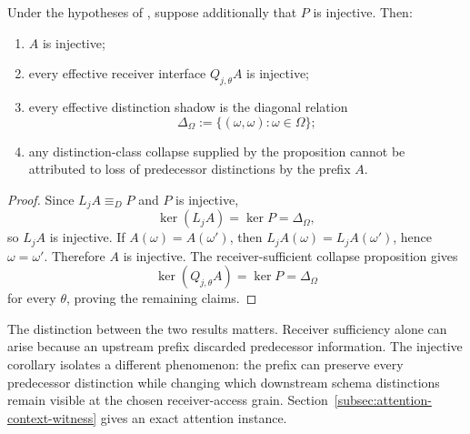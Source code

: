 \begin{corollary}\label{cor:injective-receiver-sufficient-v14}
Under the hypotheses of , suppose additionally that $P$ is injective. Then:
\begin{enumerate}[label=(\roman*)]
\item $A$ is injective;
\item every effective receiver interface $Q_{j,\theta}A$ is injective;
\item every effective distinction shadow is the diagonal relation
\[
\Delta_\Omega:=\{(\omega,\omega):\omega\in\Omega\};
\]
\item any distinction-class collapse supplied by the proposition cannot be attributed to loss of predecessor distinctions by the prefix $A$.
\end{enumerate}
\end{corollary}

\begin{proof}
Since $L_jA\equiv_DP$ and $P$ is injective,
\[
\ker(L_jA)=\ker P=\Delta_\Omega,
\]
so $L_jA$ is injective. If $A(\omega)=A(\omega')$, then $L_jA(\omega)=L_jA(\omega')$, hence $\omega=\omega'$. Therefore $A$ is injective. The receiver-sufficient collapse proposition gives
\[
\ker(Q_{j,\theta}A)=\ker P=\Delta_\Omega
\]
for every $\theta$, proving the remaining claims.
\end{proof}

The distinction between the two results matters. Receiver sufficiency alone can arise because an upstream prefix discarded predecessor information. The injective corollary isolates a different phenomenon: the prefix can preserve every predecessor distinction while changing which downstream schema distinctions remain visible at the chosen receiver-access grain. Section~\ref{subsec:attention-context-witness} gives an exact attention instance.
